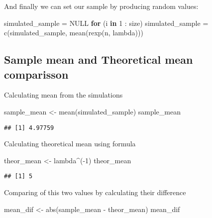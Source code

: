 \documentclass[
]{article}
\newenvironment{Shaded}{\begin{snugshade}}{\end{snugshade}}
\newcommand{\ConstantTok}[1]{\textcolor[rgb]{0.00,0.00,0.00}{#1}}
\newcommand{\ControlFlowTok}[1]{\textcolor[rgb]{0.13,0.29,0.53}{\textbf{#1}}}
\newcommand{\DecValTok}[1]{\textcolor[rgb]{0.00,0.00,0.81}{#1}}
\newcommand{\FunctionTok}[1]{\textcolor[rgb]{0.00,0.00,0.00}{#1}}
\newcommand{\NormalTok}[1]{#1}
\newcommand{\OtherTok}[1]{\textcolor[rgb]{0.56,0.35,0.01}{#1}}
\newcommand{\SpecialCharTok}[1]{\textcolor[rgb]{0.00,0.00,0.00}{#1}}
\begin{document}
And finally we can set our sample by producing random values:

\begin{Shaded}
\begin{Highlighting}[]
\NormalTok{simulated\_sample }\OtherTok{=} \ConstantTok{NULL}
\ControlFlowTok{for}\NormalTok{ (i }\ControlFlowTok{in} \DecValTok{1} \SpecialCharTok{:}\NormalTok{ size) simulated\_sample }\OtherTok{=} \FunctionTok{c}\NormalTok{(simulated\_sample, }\FunctionTok{mean}\NormalTok{(}\FunctionTok{rexp}\NormalTok{(n, lambda)))}
\end{Highlighting}
\end{Shaded}

\hypertarget{sample-mean-and-theoretical-mean-comparisson}{%
\subsection{Sample mean and Theoretical mean
comparisson}\label{sample-mean-and-theoretical-mean-comparisson}}

Calculating mean from the simulations

\begin{Shaded}
\begin{Highlighting}[]
\NormalTok{sample\_mean }\OtherTok{\textless{}{-}} \FunctionTok{mean}\NormalTok{(simulated\_sample)}
\NormalTok{sample\_mean}
\end{Highlighting}
\end{Shaded}

\begin{verbatim}
## [1] 4.97759
\end{verbatim}

Calculating theoretical mean using formula

\begin{Shaded}
\begin{Highlighting}[]
\NormalTok{theor\_mean }\OtherTok{\textless{}{-}}\NormalTok{ lambda}\SpecialCharTok{\^{}}\NormalTok{(}\SpecialCharTok{{-}}\DecValTok{1}\NormalTok{)}
\NormalTok{theor\_mean}
\end{Highlighting}
\end{Shaded}

\begin{verbatim}
## [1] 5
\end{verbatim}

Comparing of this two values by calculating their difference

\begin{Shaded}
\begin{Highlighting}[]
\NormalTok{mean\_dif }\OtherTok{\textless{}{-}} \FunctionTok{abs}\NormalTok{(sample\_mean }\SpecialCharTok{{-}}\NormalTok{ theor\_mean)}
\NormalTok{mean\_dif}
\end{Highlighting}
\end{Shaded}
\end{document}
